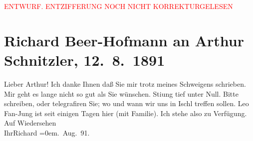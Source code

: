 
\begin{center}
            \textcolor{red}{ENTWURF. ENTZIFFERUNG NOCH NICHT KORREKTURGELESEN}
                      \end{center}
            
               \section[Richard Beer-Hofmann an Arthur Schnitzler, 12. 8. 1891]{ Richard Beer-Hofmann an Arthur Schnitzler,
               12. 8. 1891}\nopagebreak{}\rehead{ }\begin{ledgroupsized}[t]{13cm}\normalsize\beginnumbering{} \toendnotes[C]{\smallbreak\pagebreak[2]} 
\pstart
           \noindent{}{\pb}Lieber Arthur! \hspace*{2em}Ich danke Ihnen daß Sie mir trotz meines Schweigens
               schrieben. Mir geht es lange nicht so gut als Sie wünschen. Sti{\geminationm}ung tief unter Null. Bitte schreiben, oder telegrafiren
               Sie; wo und wann wir uns in Ischl treffen sollen.
                  Leo Fan-Jung ist seit einigen Tagen hier (mit Familie). Ich stehe also zu Verfügung.\pend
           \pstart
           Auf Wiedersehen{\\[\baselineskip]}Ihr\spacefill\mbox{Richard}\pend
           \leftskip=0em{}. Aug. 91.\pend
           \endnumbering{}\end{ledgroupsized}  \newcommand{\dateiname}{L00031}\newcommand{\titel}{Richard Beer-Hofmann an Arthur Schnitzler, 12. 8. 1891}\newcommand{\editorInnen}{Martin Anton Müller und Gerd-Hermann Susen}
      
